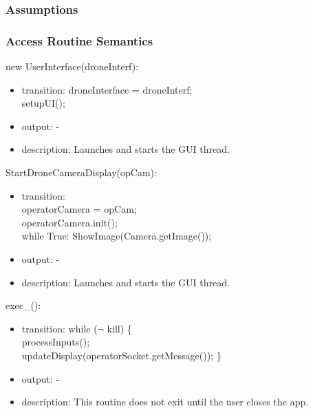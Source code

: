 \documentclass[12pt, titlepage]{article}
\begin{document}
\subsubsection{Assumptions}
\subsubsection{Access Routine Semantics}
\noindent new UserInterface(droneInterf):
\begin{itemize}
\item transition: droneInterface = droneInterf; \\
setupUI();
\item output: -
\item description: Launches and starts the GUI thread.  
\end{itemize}
\noindent StartDroneCameraDisplay(opCam):
\begin{itemize}
\item transition: \\
operatorCamera = opCam; \\
operatorCamera.init(); \\
    while True: ShowImage(Camera.getImage());\\
\item output: -
\item description: Launches and starts the GUI thread.  
\end{itemize}
\noindent exec\_():
\begin{itemize}
\item transition: while ($\neg$ kill) \{ \\ processInputs(); \\ updateDisplay(operatorSocket.getMessage()); \}
\item output: -
\item description: This routine does not exit until the user closes the app.  
\end{itemize}
\end{document}
